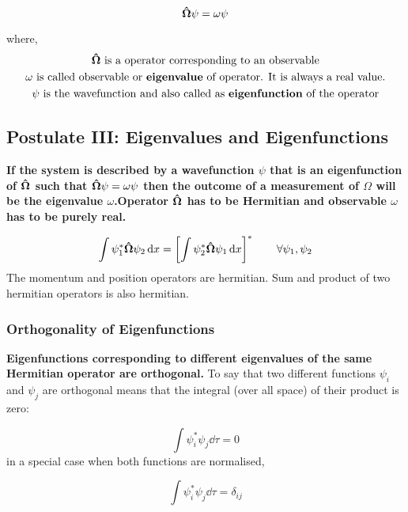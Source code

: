 \documentclass[11pt]{article}
\theoremstyle{definition}
\begin{document}
\begin{equation*}
    \vectorunit{\Omega} \psi = \omega \psi
\end{equation*}

where,
\begin{gather*}
    \vectorunit{\Omega} \text{ is a operator corresponding to an observable} \\
    \omega\text{ is called observable or \textbf{eigenvalue} of operator. It is always a real value.}\\
    \psi \text{ is the wavefunction and also called as \textbf{eigenfunction} of the operator}
\end{gather*}

\subsection{Postulate III: Eigenvalues and Eigenfunctions}
\textbf{If the system is described by a wavefunction $\psi$ that is an eigenfunction of $\vectorunit{\Omega}$ such that $\vectorunit{\Omega} \psi = \omega \psi$ then the outcome of a measurement of $\Omega$ will be the eigenvalue $\omega$.Operator $\vectorunit{\Omega}$ has to be Hermitian and observable $\omega$ has to be purely real.}


\begin{equation*}
    \int \psi_1 ^* \vectorunit{\Omega} \psi_2 \dd{x} = \left[ \int \psi_2 ^* \vectorunit{\Omega} \psi_1 \dd{x} \right]^* \quad \quad \forall \psi_1, \psi_2
\end{equation*}
The momentum and position operators are hermitian. Sum and product of two hermitian operators is also hermitian.

\subsubsection{Orthogonality of Eigenfunctions}
\textbf{Eigenfunctions corresponding to different eigenvalues of the same Hermitian operator are orthogonal.} To say that two different functions $\psi_i$ and $\psi_j$ are orthogonal means that the integral (over all space) of their product is zero:

\begin{equation*}
    \int \psi_i ^* \psi_j \dd{\tau} = 0
\end{equation*}
in a special case when both functions are normalised,

\begin{equation*}
    \int \psi_i ^* \psi_j \dd{\tau} = \delta_{ij}
\end{equation*}
\end{document}
